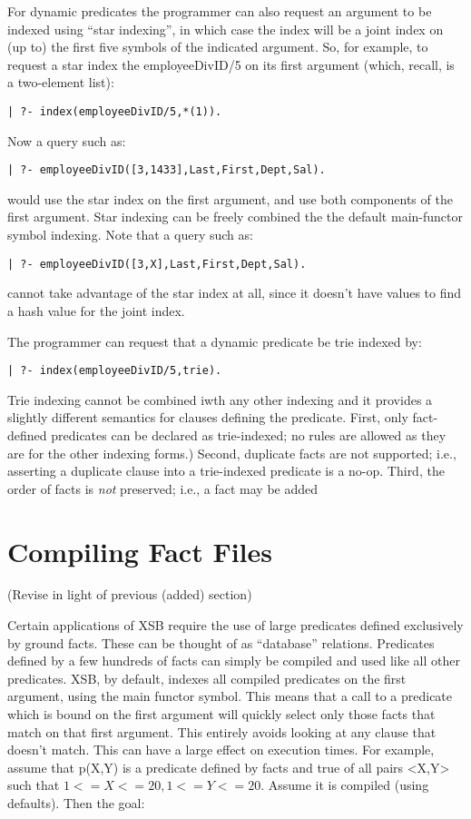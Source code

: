 For dynamic predicates the programmer can also request an argument to
be indexed using ``star indexing'', in which case the index will be a
joint index on (up to) the first five symbols of the indicated
argument.  So, for example, to request a star index the
employeeDivID/5 on its first argument (which, recall, is a two-element
list):
\begin{verbatim}
| ?- index(employeeDivID/5,*(1)).
\end{verbatim}
Now a query such as:
\begin{verbatim}
| ?- employeeDivID([3,1433],Last,First,Dept,Sal).
\end{verbatim}
would use the star index on the first argument, and use both
components of the first argument.  Star indexing can be freely
combined the the default main-functor symbol indexing.  Note that a
query such as:
\begin{verbatim}
| ?- employeeDivID([3,X],Last,First,Dept,Sal).
\end{verbatim}
cannot take advantage of the star index at all, since it doesn't have
values to find a hash value for the joint index.

The programmer can request that a dynamic predicate be trie indexed
by:
\begin{verbatim}
| ?- index(employeeDivID/5,trie).
\end{verbatim}
Trie indexing cannot be combined iwth any other indexing and it
provides a slightly different semantics for clauses defining the
predicate.  First, only fact-defined predicates can be declared as
trie-indexed; no rules are allowed as they are for the other indexing
forms.)  Second, duplicate facts are not supported; i.e., asserting a
duplicate clause into a trie-indexed predicate is a no-op.  Third, the
order of facts is {\em not} preserved; i.e., a fact may be added 






\section{Compiling Fact Files}

(Revise in light of previous (added) section)

Certain applications of XSB require the use of large predicates 
defined exclusively by ground facts.  These can be thought of as
``database'' relations.  Predicates defined by a few hundreds of facts
can simply be compiled and used like all other predicates.  XSB, by
default, indexes all compiled predicates on the first argument, using
the main functor symbol.  This means that a call to a predicate which
is bound on the first argument will quickly select only those facts
that match on that first argument.  This entirely avoids looking at
any clause that doesn't match.  This can have a large effect on
execution times.  For example, assume that p(X,Y) is a predicate
defined by facts and true of all pairs <X,Y> such that $1 <= X <= 20,
1 <= Y <= 20$.  Assume it is compiled (using defaults).  Then the
goal:

